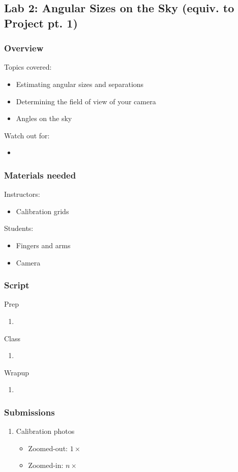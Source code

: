 \documentclass[12pt]{article}
\begin{document}
\newpage
\subsection{Lab 2: Angular Sizes on the Sky (equiv. to Project pt. 1)}
\subsubsection{Overview}
Topics covered:
\begin{itemize}
\item Estimating angular sizes and separations
\item Determining the field of view of your camera
\item Angles on the sky
\end{itemize}
Watch out for:
\begin{itemize}
\item 
\end{itemize}

\subsubsection{Materials needed}
Instructors:
\begin{itemize}
  \item Calibration grids
\end{itemize}
Students:
\begin{itemize}
  \item Fingers and arms
  \item Camera
\end{itemize}

\subsubsection{Script}
Prep
\begin{enumerate}
\item
\end{enumerate}
Class
\begin{enumerate}
\item
\end{enumerate}
Wrapup
\begin{enumerate}
\item
\end{enumerate}

\subsubsection{Submissions}
\begin{enumerate}
    \item Calibration photos
    \begin{itemize}
        \item Zoomed-out: $1\times$
        \item Zoomed-in: $n\times$
    \end{itemize}
\end{enumerate}
\end{document}
